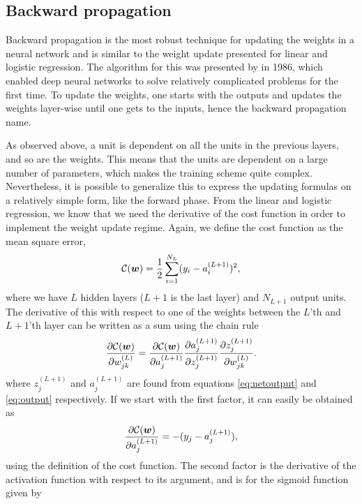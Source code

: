 \subsection{Backward propagation} \label{sec:backward}
Backward propagation is the most robust technique for updating the weights in a neural network and is similar to the weight update presented for linear and logistic regression. The algorithm for this was presented by \citet{rumelhart_learning_1986} in 1986, which enabled deep neural networks to solve relatively complicated problems for the first time. To update the weights, one starts with the outputs and updates the weights layer-wise until one gets to the inputs, hence the backward propagation name. 

As observed above, a unit is dependent on all the units in the previous layers, and so are the weights. This means that the units are dependent on a large number of parameters, which makes the training scheme quite complex. Nevertheless, it is possible to generalize this to express the updating formulas on a relatively simple form, like the forward phase. From the linear and logistic regression, we know that we need the derivative of the cost function in order to implement the weight update regime. Again, we define the cost function as the mean square error,
\begin{equation}
\mathcal{C}(\boldsymbol{{w}})=\frac{1}{2}\sum_{i=1}^{N_L}(y_i-a_i^{(L+1)})^2,
\end{equation}
where we have $L$ hidden layers ($L+1$ is the last layer) and $N_{L+1}$ output units. The derivative of this with respect to one of the weights between the $L$'th and $L+1$'th layer can be written as a sum using the chain rule
\begin{equation}
\frac{\partial\mathcal{C}(\boldsymbol{{w}})}{\partial w_{jk}^{(L)}}=\frac{\partial\mathcal{C}(\boldsymbol{{w}})}{\partial a_j^{(L+1)}}\frac{\partial a_j^{(L+1)}}{\partial z_j^{(L+1)}}\frac{\partial z_j^{(L+1)}}{\partial w_{jk}^{(L)}}.
\end{equation}
where $z_j^{(L+1)}$ and $a_j^{(L+1)}$ are found from equations \eqref{eq:netoutput} and \eqref{eq:output} respectively. If we start with the first factor, it can easily be obtained as
\begin{equation}
\frac{\partial\mathcal{C}(\boldsymbol{{w}})}{\partial a_j^{(L+1)}}=-(y_j-a_j^{(L+1)}),
\end{equation}
using the definition of the cost function. The second factor is the derivative of the activation function with respect to its argument, and is for the sigmoid function given by
